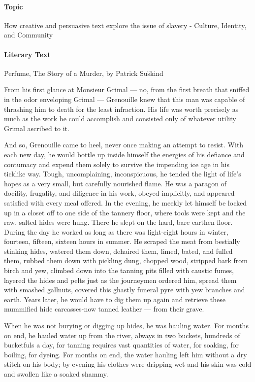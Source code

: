 \documentclass[a4paper,12pt]{article}
\begin{document}
\paragraph{Topic}
How creative and persuasive text explore the issue of slavery - Culture, Identity, and Community

\paragraph{Literary Text}
Perfume, The Story of a Murder, by Patrick Su\"skind

\begin{linenumbers}
    From his first glance at Monsieur Grimal --- no, from the first breath that sniffed in the odor
enveloping Grimal --- Grenouille knew that this man was capable of thrashing him to death for the least
infraction. His life was worth precisely as much as the work he could accomplish and consisted only of
whatever utility Grimal ascribed to it.

And so, Grenouille came to heel, never once making an attempt
to  resist.  With  each  new  day,  he  would  bottle  up  inside  himself  the  energies  of  his  defiance  and
contumacy  and  expend  them  solely  to  survive  the  impending  ice  age  in  his  ticklike  way.  Tough,
uncomplaining,  inconspicuous,  he  tended  the  light  of  life’s  hopes  as  a  very  small,  but  carefully
nourished flame. He was a paragon of docility, frugality, and diligence in his work, obeyed implicitly,
and appeared satisfied with every meal offered. In the evening, he meekly let himself be locked up in a
closet off to one side of the tannery floor, where tools were kept and the raw, salted hides were hung.
There  he  slept  on  the  hard,  bare  earthen  floor.  During  the  day  he  worked  as  long  as  there  was
light-eight  hours  in  winter,  fourteen,  fifteen,  sixteen  hours  in  summer.  He  scraped  the  meat  from
bestially  stinking  hides,  watered  them  down,  dehaired  them,  limed,  bated, and fulled  them,  rubbed
them down with pickling dung, chopped wood, stripped bark from birch and yew, climbed down into
the tanning pits filled with caustic fumes, layered the hides and pelts just as the journeymen ordered
him,  spread  them  with  smashed  gallnuts,  covered  this  ghastly  funeral  pyre  with  yew  branches  and
earth.  Years  later,  he  would  have  to  dig  them  up  again  and  retrieve  these  mummified  hide
carcasses-now tanned leather --- from their grave.

When he was not burying or digging up hides, he was hauling water. For months on end, he
hauled  water  up  from  the  river,  always  in  two  buckets,  hundreds  of  bucketfuls  a  day,  for  tanning
requires vast quantities of water, for soaking, for boiling, for dyeing. For months on end, the water
hauling left him without a dry stitch on his body; by evening his clothes were dripping wet and his skin
was cold and swollen like a soaked shammy.
\end{linenumbers}
\end{document}
